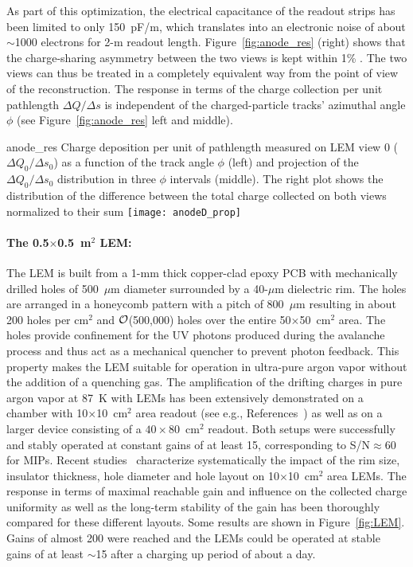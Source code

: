 As part of this optimization, the electrical capacitance of the readout strips has been limited to only 150~pF/m, which translates
into an electronic noise of about $\sim$1000 electrons for 2-m readout length.  Figure~\ref{fig:anode_res} (right) shows that the charge-sharing 
asymmetry between the two views is kept within 1\% . The two views can thus be treated in a completely equivalent way from the
point of view of the reconstruction. The response in terms of the charge collection per unit pathlength $\Delta Q/\Delta s$ is
independent of the charged-particle tracks' azimuthal angle $\phi$ (see Figure~\ref{fig:anode_res} left and middle).

\begin{cdrfigure}{anode_res} {Charge deposition per unit of pathlength measured on LEM view 0 
($\Delta Q_0/\Delta s_0$) as a function  of the track angle $\phi$ (left) and  projection of the  $\Delta Q_0/\Delta s_0$ distribution in three $\phi$ intervals (middle).  The right plot  shows the distribution of the difference between the total charge  collected on both views normalized to their sum}
\texttt{[image: anodeD\_prop]}
\end{cdrfigure}

\paragraph{The 0.5$\times$0.5~m$^2$ LEM:}

The LEM is built from a 1-mm thick copper-clad epoxy PCB with mechanically drilled holes of 500~$\mu$m diameter surrounded by a
40-$\mu$m dielectric rim. The holes are arranged in a honeycomb pattern with a pitch of 800~$\mu$m resulting in about 200 holes per cm$^2$
and $\cal O$(500,000) holes over the entire 50$\times$50~cm$^2$ area. The holes provide confinement for the UV photons produced
during the avalanche process and thus act as a mechanical quencher to prevent photon feedback. This property makes the LEM suitable for
operation in ultra-pure argon vapor without the addition of a quenching gas. The amplification of the drifting charges in pure argon
vapor at 87~K with LEMs has been extensively demonstrated on a chamber with 10$\times$10~cm$^2$ area readout (see e.g.,
References~\cite{Badertscher:2008rf,Badertscher:2010fi}) as well as on a larger device consisting of a $40\times80$~cm$^2$
readout\cite{Badertscher:2013wm}.  Both setups were successfully and stably operated  at constant gains of at least 15,
corresponding to S/N$\approx$60 for MIPs. Recent studies~\cite{Cantini:2014xza} characterize systematically the impact
of the rim size, insulator thickness, hole diameter and hole layout on 10$\times$10~cm$^2$ area LEMs. The response in terms of maximal
reachable gain and influence on the collected charge uniformity as well as the long-term stability of the gain has been thoroughly
compared for these different layouts. Some results are shown in Figure~\ref{fig:LEM}.  Gains of almost 200 were reached and the
LEMs could be operated at stable gains of at least $\sim$15 after a charging up period of about a day.

